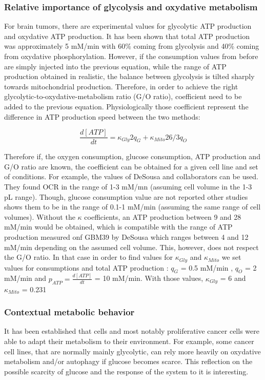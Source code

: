 \documentclass[11pt,a4paper]{article}
\begin{document}
\subsubsection{Relative importance of glycolysis and oxydative metabolism}
For brain tumors, there are experimental values for glycolytic ATP production and oxydative ATP production. It has been shown that total ATP production was approximately 5 mM/min with 60\% coming from glycolysis and 40\% coming from oxydative phosphorylation. However, if the consumption values from before are simply injected into the previous equation, while the range of ATP production obtained in realistic, the balance between glycolysis is tilted sharply towards mitochondrial production. Therefore, in order to achieve the right glycolytic-to-oxydative-metabolism ratio (G/O ratio), coefficient need to be added to the previous equation. Physiologically those coefficient represent the difference in ATP production  speed between the two methods: 

\[ \frac{d[ATP]}{dt} = \kappa_{Gly} 2q_G + \kappa_{Mito} 26/3q_O  \] 

Therefore if, the oxygen consumption, glucose consumption, ATP production and G/O ratio are known, the coefficient can be obtained for a given cell line and set of conditions. For example, the values of DeSousa and collaborators can be used.\cite{DeSousa2022} They found OCR in the range of 1-3 mM/mn (assuming cell volume in the 1-3 pL range). Though, glucose consumption value are not reported other studies shows  them to be in the range of 0.1-1 mM/min (assuming the same range of cell volumes). Without the $\kappa$ coefficients, an ATP production between 9 and 28 mM/min would be obtained, which is compatible with the range of ATP production measured onf GBM39 by DeSousa which ranges between 4 and 12 mM/min depending on the assumed cell volume. This, however, does not respect the G/O ratio.
In that case in order to find values for $\kappa_{Gly}$ and $\kappa_{Mito}$ we set values for consumptions and total ATP production : $q_G$ = 0.5 mM/min , $q_O$ = 2 mM/min and $p_{ATP} =  \frac{d[ATP]}{dt} $ = 10 mM/min. With those values, $\kappa_{Gly}$ = 6 and $\kappa_{Mito}$ = 0.231


\subsubsection{Contextual metabolic behavior}
It has been established that cells and most notably proliferative cancer cells were able to adapt their metabolism to their environment. For example, some cancer cell lines, that are normally mainly glycolytic, can rely more heavily on oxydative metabolism and/or autophagy if glucose becomes scarce.\cite{MullerKlieser1986} This reflection on the possible scarcity of glucose and the response of the system to it is interesting.
\end{document}
